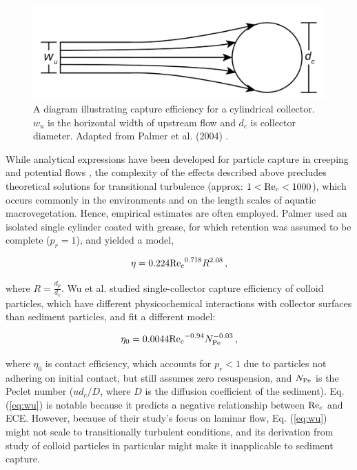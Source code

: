\documentclass[geosciences,article,submit,moreauthors,pdftex]{Definitions/mdpi}
\begin{document}
\begin{figure}[H]
\includegraphics[width=5in]{../pics/collectorefficiency.png}
\centering
\caption{A diagram illustrating capture efficiency for a cylindrical collector. $w_u$ is the horizontal width of upstream flow and $d_c$ is collector diameter. Adapted from Palmer et al. (2004) \cite{Palmer_2004}.}
\label{fig:capeff}
\end{figure}

While analytical expressions have been developed for particle capture in creeping and potential flows \cite{lamb1932, langmuir1942filtration, fuchs1965mechanics}, the complexity of the effects described above precludes theoretical solutions for transitional turbulence (approx: $1<\mathrm{Re}_c<1000$), which occurs commonly in the environments and on the length scales of aquatic macrovegetation. Hence, empirical estimates are often employed. Palmer used an isolated single cylinder coated with grease, for which retention was assumed to be complete ($p_r = 1$), and yielded a model,

\begin{equation}
    \eta=0.224{\mathrm{Re}_c}^{0.718}R^{2.08}\,,
    \label{eq:palmer}
\end{equation}

\noindent where $R = \frac{d_p}{d_c}$. Wu et al. \cite{Wu_2011} studied single-collector capture efficiency of colloid particles, which have different physicochemical interactions with collector surfaces than sediment particles, and fit a different model:

\begin{equation}
    \eta_0=0.0044{\mathrm{Re}_c}^{-0.94}N_{\mathrm{Pe}}^{-0.03}\,,
    \label{eq:wu}
\end{equation}

\noindent where $\eta_0$ is contact efficiency, which accounts for $p_r < 1$ due to particles not adhering on initial contact, but still assumes zero resuspension, and $N_{\mathrm{Pe}}$ is the Peclet number ($ud_c/D$, where $D$ is the diffusion coefficient of the sediment). Eq. (\ref{eq:wu}) is notable because it predicts a negative relationship between $\mathrm{Re}_c$ and ECE. However, because of their study's focus on laminar flow, Eq. (\ref{eq:wu}) might not scale to transitionally turbulent conditions, and its derivation from study of colloid particles in particular might make it inapplicable to sediment capture.
\end{document}
